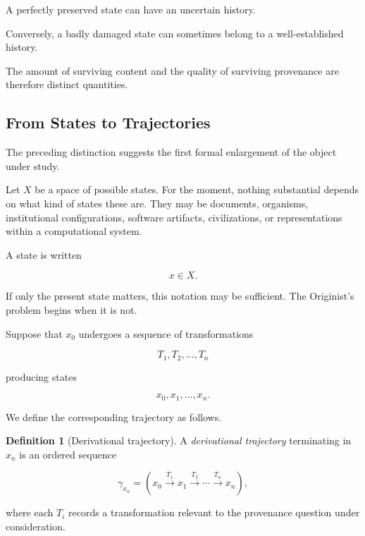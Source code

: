\documentclass[
  11pt,
  a4paper,
  DIV=12,
  BCOR=0mm,
  parskip=half-
]{scrartcl}
\newcommand{\traj}[1]{\gamma_{#1}}
\theoremstyle{definition}
\newtheorem{definition}{Definition}[section]
\theoremstyle{plain}
\theoremstyle{remark}
\begin{document}
A perfectly preserved state can have an uncertain history.

Conversely, a badly damaged state can sometimes belong to a well-established
history.

The amount of surviving content and the quality of surviving provenance are
therefore distinct quantities.


\subsection{From States to Trajectories}
\label{sec:states-trajectories}

The preceding distinction suggests the first formal enlargement of the object
under study.

Let \(X\) be a space of possible states. For the moment, nothing substantial
depends on what kind of states these are. They may be documents, organisms,
institutional configurations, software artifacts, civilizations, or
representations within a computational system.

A state is written

\[
  x\in X.
\]

If only the present state matters, this notation may be sufficient. The
Originist's problem begins when it is not.

Suppose that \(x_0\) undergoes a sequence of transformations

\[
  T_1,T_2,\ldots,T_n
\]

producing states

\[
  x_0,x_1,\ldots,x_n.
\]

We define the corresponding trajectory as follows.

\begin{definition}[Derivational trajectory]
\label{def:trajectory}
A \emph{derivational trajectory} terminating in \(x_n\) is an ordered sequence

\[
  \traj{x_n}
  =
  \left(
    x_0
    \xrightarrow{T_1}
    x_1
    \xrightarrow{T_2}
    \cdots
    \xrightarrow{T_n}
    x_n
  \right),
\]

where each \(T_i\) records a transformation relevant to the provenance
question under consideration.
\end{definition}
\end{document}
